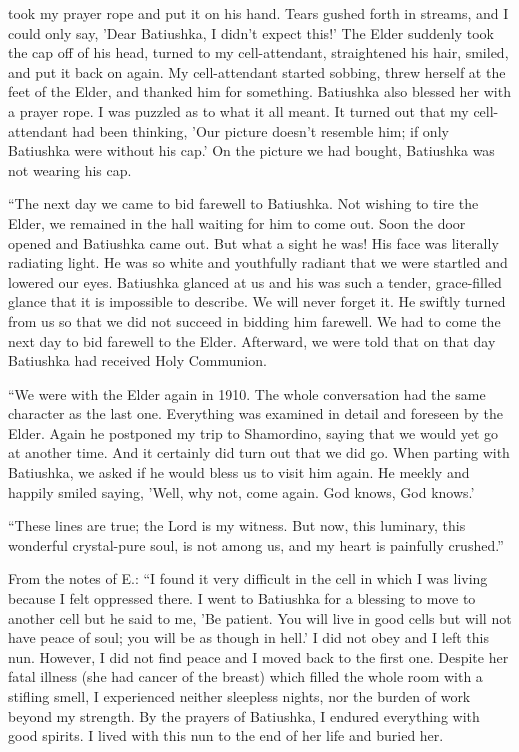 took my prayer rope and put it on his hand. Tears gushed forth in streams, and I could only say, 'Dear Batiushka, I didn't expect this!' The Elder suddenly took the cap off of his head, turned to my cell-attendant, straightened his hair, smiled, and put it back on again. My cell-attendant started sobbing, threw herself at the feet of the Elder, and thanked him for something. Batiushka also blessed her with a prayer rope. I was puzzled as to what it all meant. It turned out that my cell-attendant had been thinking, 'Our picture doesn't resemble him; if only Batiushka were without his cap.' On the picture we had bought, Batiushka was not wearing his cap.

“The next day we came to bid farewell to Batiushka. Not wishing to tire the Elder, we remained in the hall waiting for him to come out. Soon the door opened and Batiushka came out. But what a sight he was! His face was literally radiating light. He was so white and youthfully radiant that we were startled and lowered our eyes. Batiushka glanced at us and his was such a tender, grace-filled glance that it is impossible to describe. We will never forget it. He swiftly turned from us so that we did not succeed in bidding him farewell. We had to come the next day to bid farewell to the Elder. Afterward, we were told that on that day Batiushka had received Holy Communion.

“We were with the Elder again in 1910. The whole conversation had the same character as the last one. Everything was examined in detail and foreseen by the Elder. Again he postponed my trip to Shamordino, saying that we would yet go at another time. And it certainly did turn out that we did go. When parting with Batiushka, we asked if he would bless us to visit him again. He meekly and happily smiled saying, 'Well, why not, come again. God knows, God knows.'

“These lines are true; the Lord is my witness. But now, this luminary, this wonderful crystal-pure soul, is not among us, and my heart is painfully crushed.”

From the notes of E.: “I found it very difficult in the cell in which I was living because I felt oppressed there. I went to Batiushka for a blessing to move to another cell but he said to me, 'Be patient. You will live in good cells but will not have peace of soul; you will be as though in hell.' I did not obey and I left this nun. However, I did not find peace and I moved back to the first one. Despite her fatal illness (she had cancer of the breast) which filled the whole room with a stifling smell, I experienced neither sleepless nights, nor the burden of work beyond my strength. By the prayers of Batiushka, I endured everything with good spirits. I lived with this nun to the end of her life and buried her.

